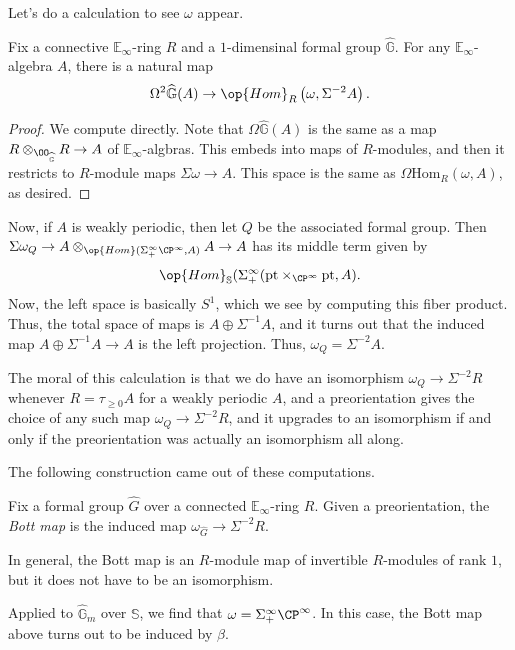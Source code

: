 \documentclass[../notes.tex]{subfiles}
\begin{document}
Let's do a calculation to see $\omega$ appear.
\begin{lemma}
	Fix a connective $\mathbb E_\infty$-ring $R$ and a $1$-dimensinal formal group $\widehat{\mathbb G}$. For any $\mathbb E_\infty$-algebra $A$, there is a natural map
	\[\Omega^2\widehat{\mathbb G}(A)\to\op{Hom}_R\left(\omega,\Sigma^{-2}A\right).\]
\end{lemma}
\begin{proof}
	We compute directly. Note that $\Omega\widehat{\mathbb G}(A)$ is the same as a map $R\otimes_{\OO_{\widehat{\mathbb G}}}R\to A$ of $\mathbb E_\infty$-algbras. This embeds into maps of $R$-modules, and then it restricts to $R$-module maps $\Sigma\omega\to A$. This space is the same as $\Omega\mathrm{Hom}_R(\omega,A)$, as desired.
\end{proof}
\begin{example}
	Now, if $A$ is weakly periodic, then let $Q$ be the associated formal group. Then $\Sigma\omega_Q\to A\otimes_{\op{Hom}(\Sigma_+^\infty\CP^\infty,A)} A\to A$ has its middle term given by
	\[\op{Hom}_{\mathbb S}(\Sigma_+^\infty(\mathrm{pt}\times_{\CP^\infty}\mathrm{pt},A).\]
	Now, the left space is basically $S^1$, which we see by computing this fiber product. Thus, the total space of maps is $A\oplus\Sigma^{-1}A$, and it turns out that the induced map $A\oplus\Sigma^{-1}A\to A$ is the left projection. Thus, $\omega_Q=\Sigma^{-2}A$.
\end{example}
The moral of this calculation is that we do have an isomorphism $\omega_Q\to\Sigma^{-2}R$ whenever $R=\tau_{\ge0}A$ for a weakly periodic $A$, and a preorientation gives the choice of any such map $\omega_Q\to\Sigma^{-2}R$, and it upgrades to an isomorphism if and only if the preorientation was actually an isomorphism all along.

The following construction came out of these computations.
\begin{definition}
	Fix a formal group $\widehat G$ over a connected $\mathbb E_\infty$-ring $R$. Given a preorientation, the \textit{Bott map} is the induced map $\omega_{\widehat G}\to\Sigma^{-2}R$.
\end{definition}
\begin{remark}
	In general, the Bott map is an $R$-module map of invertible $R$-modules of rank $1$, but it does not have to be an isomorphism.
\end{remark}
\begin{example}
	Applied to $\widehat{\mathbb G}_m$ over $\mathbb S$, we find that $\omega=\Sigma_+^\infty\CP^\infty$. In this case, the Bott map above turns out to be induced by $\beta$.
\end{example}
\end{document}
